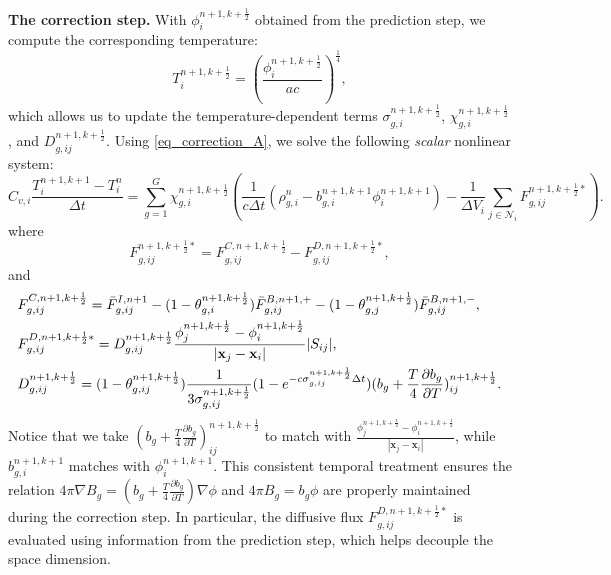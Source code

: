 \documentclass[preprint,12pt]{elsarticle}
\theoremstyle{definition}
\theoremstyle{plain}
\numberwithin{equation}{section}
\numberwithin{algorithm}{section}
\newcounter{eq_count}
\newcounter{subeq_count}
\newcommand{\half}{\frac{1}{2}}
\newcommand{\vr}{\mathbf{x}}
\newcommand{\pdrv}[2]{\frac{\partial{#1}}{\partial{#2}}}
\begin{document}
    	\textbf{The correction step.}
    	With $\phi_i^{n+1,k+\frac{1}{2}}$ obtained from the prediction step, we compute the corresponding temperature:
    	\begin{equation*}
    		T_i^{n+1,k+\frac{1}{2}} = \left( \frac{\phi_i^{n+1,k+\frac{1}{2}}}{ac} \right)^{\frac{1}{4}},
    	\end{equation*}
    	which allows us to update the temperature-dependent terms $\sigma_{g,i}^{n+1,k+\frac{1}{2}}$, $\chi_{g,i}^{n+1,k+\frac{1}{2}}$, and $D_{g,ij}^{n+1,k+\frac{1}{2}}$. Using \eqref{eq_correction_A}, we solve the following \textit{scalar} nonlinear system:
    	\begin{equation} \label{eq_correction_B}
    		C_{v,i} \frac{T^{n+1,k+1}_i - T^n_i}{\Delta t}=\sum_{g=1}^{G} \chi_{g,i}^{n+1,k+\half} \left( \frac{1}{c \Delta t}\left(\rho_{g,i}^n -  b_{g,i}^{n+1,k+1} \phi_i^{n+1,k+1}  \right)  -   \frac{1}{\Delta V_i} \sum_{j \in \mathcal{N}_i} 
    		F_{g,ij}^{n+1,k+\half*} \right) .
    	\end{equation}
    	where 
    	\begin{equation*}
    		F_{g,ij}^{n+1,k+\half*} = F_{g,ij}^{C,n+1,k+\half} -  F_{g,ij}^{D,n+1,k+\half*},
    	\end{equation*}
    	and
    	\begin{subequations}
    		\begin{align*}
    			&F_{g,ij}^{C,n+1,k+\half} = \Bar{F}_{g,ij}^{I,n+1} 
    			- (1 - \theta_{g,i}^{n+1,k+\half}) \Bar{F}_{g,ij}^{B,n+1,+}
    			- (1 - \theta_{g,j}^{n+1,k+\half}) \Bar{F}_{g,ij}^{B,n+1,-},
    			\\
    			&F_{g,ij}^{D,n+1,k+\half*} = D_{g,ij}^{n+1,k+\half} \frac{\phi_{j}^{n+1,k+\half} - \phi_i^{n+1,k+\half}}{ |\vr_j - \vr_i| }|S_{ij}|,
    			\\
    			&D_{g,ij}^{n+1,k+\half} =  ( 1 - \theta_{g,ij}^{n+1,k+\half}  ) \frac{1 }{3\sigma_{g,ij}^{n+1,k+\half}}(1-e^{-c \sigma_{g,ij}^{n+1,k+\half}\Delta t}) (b_g + \frac{T}{4} \pdrv{b_g}{T})_{ij}^{n+1,k+\half}.
    		\end{align*}
    	\end{subequations}
    	Notice that we take $\left( b_g + \frac{T}{4} \frac{\partial b_g}{\partial T} \right)_{ij}^{n+1,k+\frac{1}{2}}$ to match with $\frac{\phi_{j}^{n+1,k+\half} - \phi_i^{n+1,k+\half}}{ |\vr_j - \vr_i| }$, while $b_{g,i}^{n+1,k+1}$ matches with $\phi_i^{n+1,k+1}$. This consistent temporal treatment ensures the  relation $  4 \pi \nabla B_g =\left(  b_g + \frac{T}{4} \frac{\partial b_g}{\partial T} \right) \nabla \phi $ and $4 \pi B_g = b_g \phi$ are properly maintained  during  the correction step. In particular, the diffusive flux $F_{g,ij}^{D,n+1,k+\half*}$ is evaluated using information from the prediction step, which helps decouple the space dimension.
    	
\end{document}
